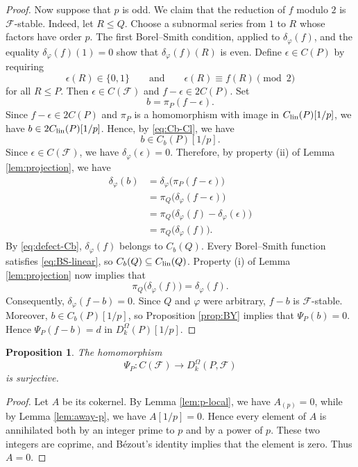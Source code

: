 \documentclass[preprint,12pt,3p]{elsarticle}
\newtheorem{proposition}[theorem]{Proposition}%
\def\F{\mathcal{F}}
\begin{document}
\begin{proof}
Now suppose that $p$ is odd.  We claim that the reduction of $f$ modulo $2$ is $\F$-stable.  Indeed, let $R\leq Q$.  Choose a subnormal series from $1$ to $R$ whose factors have order $p$.  The first Borel--Smith condition, applied to $\delta_\varphi(f)$, and the equality $\delta_\varphi(f)(1)=0$ show that $\delta_\varphi(f)(R)$ is even.  Define $\epsilon\in C(P)$ by requiring
$$
 \epsilon(R)\in\{0,1\}\qquad\text{and}\qquad
 \epsilon(R)\equiv f(R)\pmod 2
$$
for all $R\leq P$.  Then $\epsilon\in C(\F)$ and $f-\epsilon\in 2C(P)$.  Set
$$
 b=\pi_P(f-\epsilon).
$$
Since $f-\epsilon\in 2C(P)$ and $\pi_P$ is a homomorphism with image in $C_{\rm lin}(P)[1/p]$, we have $b\in 2C_{\rm lin}(P)[1/p]$. Hence, by \eqref{eq:Cb-Cl}, we have
$$
 b\in C_b(P)[1/p].
$$
Since $\epsilon\in C(\F)$, we have $\delta_\varphi(\epsilon)=0$. Therefore, by property (ii) of Lemma \ref{lem:projection}, we have
$$
 \begin{aligned}
 \delta_\varphi(b)
 &=\delta_\varphi\bigl(\pi_P(f-\epsilon)\bigr)\\
 &=\pi_Q\bigl(\delta_\varphi(f-\epsilon)\bigr)\\
 &=\pi_Q\bigl(\delta_\varphi(f)-\delta_\varphi(\epsilon)\bigr)\\
 &=\pi_Q\bigl(\delta_\varphi(f)\bigr).
 \end{aligned}
$$
By \eqref{eq:defect-Cb}, $\delta_\varphi(f)$ belongs to $C_b(Q)$. Every Borel--Smith function satisfies \eqref{eq:BS-linear}, so $C_b(Q)\subseteq C_{\rm lin}(Q)$. Property (i) of Lemma \ref{lem:projection} now implies that
$$
 \pi_Q\bigl(\delta_\varphi(f)\bigr)=\delta_\varphi(f).
$$
Consequently, $\delta_\varphi(f-b)=0$. Since $Q$ and $\varphi$ were arbitrary, $f-b$ is $\F$-stable. Moreover, $b\in C_b(P)[1/p]$, so Proposition \ref{prop:BY} implies that $\Psi_P(b)=0$. Hence $\Psi_P(f-b)=d$ in $D_k^\Omega(P)[1/p]$.
\end{proof}

\begin{proposition}\label{prop:stable-lift}
The homomorphism
$$
 \Psi_P:C(\F)\longrightarrow D_k^\Omega(P,\F)
$$
is surjective.
\end{proposition}

\begin{proof}
Let $A$ be its cokernel. By Lemma \ref{lem:p-local}, we have $A_{(p)}=0$, while by Lemma \ref{lem:away-p}, we have $A[1/p]=0$. Hence every element of $A$ is annihilated both by an integer prime to $p$ and by a power of $p$. These two integers are coprime, and B\'ezout's identity implies that the element is zero. Thus $A=0$.
\end{proof}
\end{document}
